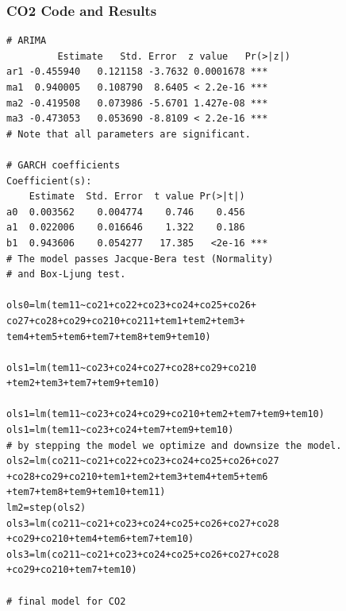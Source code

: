 \documentclass[a4paper,11pt]{article}
\begin{document}
\subsubsection{CO2 Code and Results}
\begin{verbatim}
# ARIMA
         Estimate   Std. Error  z value   Pr(>|z|)    
ar1 -0.455940   0.121158 -3.7632 0.0001678 ***
ma1  0.940005   0.108790  8.6405 < 2.2e-16 ***
ma2 -0.419508   0.073986 -5.6701 1.427e-08 ***
ma3 -0.473053   0.053690 -8.8109 < 2.2e-16 ***
# Note that all parameters are significant.

# GARCH coefficients
Coefficient(s):
    Estimate  Std. Error  t value Pr(>|t|)    
a0  0.003562    0.004774    0.746    0.456    
a1  0.022006    0.016646    1.322    0.186    
b1  0.943606    0.054277   17.385   <2e-16 ***
# The model passes Jacque-Bera test (Normality)
# and Box-Ljung test.

ols0=lm(tem11~co21+co22+co23+co24+co25+co26+
co27+co28+co29+co210+co211+tem1+tem2+tem3+
tem4+tem5+tem6+tem7+tem8+tem9+tem10)

ols1=lm(tem11~co23+co24+co27+co28+co29+co210
+tem2+tem3+tem7+tem9+tem10)

ols1=lm(tem11~co23+co24+co29+co210+tem2+tem7+tem9+tem10)
ols1=lm(tem11~co23+co24+tem7+tem9+tem10)
# by stepping the model we optimize and downsize the model.
ols2=lm(co211~co21+co22+co23+co24+co25+co26+co27
+co28+co29+co210+tem1+tem2+tem3+tem4+tem5+tem6
+tem7+tem8+tem9+tem10+tem11)
lm2=step(ols2)
ols3=lm(co211~co21+co23+co24+co25+co26+co27+co28
+co29+co210+tem4+tem6+tem7+tem10)
ols3=lm(co211~co21+co23+co24+co25+co26+co27+co28
+co29+co210+tem7+tem10)

# final model for CO2

\end{verbatim}
\end{document}
